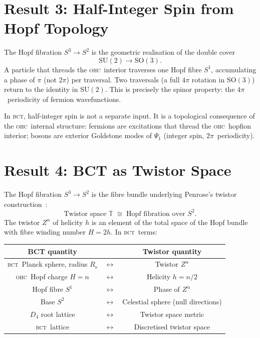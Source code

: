 \documentclass[aps,prl,preprint,superscriptaddress,floatfix]{revtex4-2}
\newcommand{\BCT}{\textsc{bct}}
\newcommand{\OHC}{\textsc{ohc}}
\newcommand{\Psiext}{\Psi_1}
\newcommand{\Rsph}{R_{\mathrm{s}}}
\newcommand{\HopfN}{H}
\begin{document}
\section{Result 3: Half-Integer Spin from Hopf Topology}
\label{sec:spin}

The Hopf fibration $S^3\to S^2$ is the geometric realisation of the
double cover
\begin{equation}
  \mathrm{SU}(2)\to\mathrm{SO}(3).
  \label{eq:double-cover}
\end{equation}
A particle that threads the \OHC\ interior traverses one Hopf fibre
$S^1$, accumulating a phase of $\pi$ (not $2\pi$) per traversal.
Two traversals (a full $4\pi$ rotation in $\mathrm{SO}(3)$) return to
the identity in $\mathrm{SU}(2)$.
This is precisely the spinor property: the $4\pi$~periodicity of
fermion wavefunctions.

In \BCT, half-integer spin is not a separate input.
It is a topological consequence of the \OHC\ internal structure:
fermions are excitations that thread the \OHC\ hopfion interior;
bosons are exterior Goldstone modes of $\Psiext$ (integer spin,
$2\pi$~periodicity).

\section{Result 4: BCT as Twistor Space}
\label{sec:twistors}

The Hopf fibration $S^3\to S^2$ is the fibre bundle underlying
Penrose's twistor construction~\cite{Penrose1967,PR1986}:
\begin{equation}
  \text{Twistor space } \mathbb{T}
  \;\cong\;
  \text{Hopf fibration over } S^2.
  \label{eq:twistor-hopf}
\end{equation}
The twistor $Z^\alpha$ of helicity $h$ is an element of the total space
of the Hopf bundle with fibre winding number $\HopfN = 2h$.
In \BCT\ terms:

\begin{center}
\begin{tabular}{ccc}
\toprule
\textbf{BCT quantity} & & \textbf{Twistor quantity} \\
\midrule
\BCT\ Planck sphere, radius $\Rsph$ & $\leftrightarrow$ & Twistor $Z^\alpha$ \\
\OHC\ Hopf charge $\HopfN = n$ & $\leftrightarrow$ & Helicity $h = n/2$ \\
Hopf fibre $S^1$ & $\leftrightarrow$ & Phase of $Z^\alpha$ \\
Base $S^2$ & $\leftrightarrow$ & Celestial sphere (null directions) \\
$D_4$ root lattice & $\leftrightarrow$ & Twistor space metric \\
\BCT\ lattice & $\leftrightarrow$ & Discretised twistor space \\
\bottomrule
\end{tabular}
\end{center}
\end{document}

